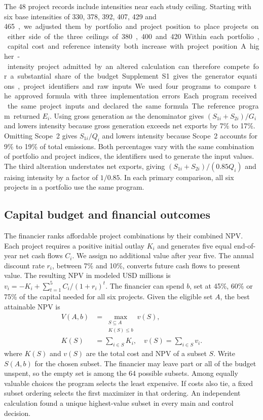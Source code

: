 The 48 project records include intensities near each study ceiling. Starting with six base intensities of 330, 378, 392, 407, 429 and 465~\unit, we adjusted them by portfolio and project position to place projects on either side of the three ceilings of 380, 400 and 420~\unit. Within each portfolio, capital cost and reference intensity both increase with project position. A higher-intensity project admitted by an altered calculation can therefore compete for a substantial share of the budget. Supplement~S1 gives the generator equations, project identifiers and raw inputs.

We used four programs to compare the approved formula with three implementation errors. Each program received the same project inputs and declared the same formula. The reference program returned $E_i$. Using gross generation as the denominator gives $(S_{1i}+S_{2i})/G_i$ and lowers intensity because gross generation exceeds net exports by 7\% to 17\%. Omitting Scope~2 gives $S_{1i}/Q_i$ and lowers intensity because Scope~2 accounts for 9\% to 19\% of total emissions. Both percentages vary with the same combination of portfolio and project indices, the identifiers used to generate the input values. The third alteration understates net exports, giving $(S_{1i}+S_{2i})/(0.85 Q_i)$ and raising intensity by a factor of $1/0.85$. In each primary comparison, all six projects in a portfolio use the same program.

\subsection{Capital budget and financial outcomes}
The financier ranks affordable project combinations by their combined NPV. Each project requires a positive initial outlay $K_i$ and generates five equal end-of-year net cash flows $C_i$. We assign no additional value after year five. The annual discount rate $r_i$, between 7\% and 10\%, converts future cash flows to present value. The resulting NPV in modeled USD millions is $v_i=-K_i+\sum_{t=1}^{5} C_i/(1+r_i)^t$. The financier can spend $b$, set at 45\%, 60\% or 75\% of the capital needed for all six projects. Given the eligible set $A$, the best attainable NPV is
\begin{equation}
\begin{aligned}
 V(A,b)&=\max_{\substack{S\subseteq A\\ K(S)\le b}}v(S),\\
 K(S)&=\sum_{i\in S}K_i,\quad v(S)=\sum_{i\in S}v_i .
 \end{aligned}\label{eq:opt}
\end{equation}
where $K(S)$ and $v(S)$ are the total cost and NPV of a subset $S$. Write $S(A,b)$ for the chosen subset. The financier may leave part or all of the budget unspent, so the empty set is among the 64 possible subsets. Among equally valuable choices the program selects the least expensive. If costs also tie, a fixed subset ordering selects the first maximizer in that ordering. An independent calculation found a unique highest-value subset in every main and control decision.

